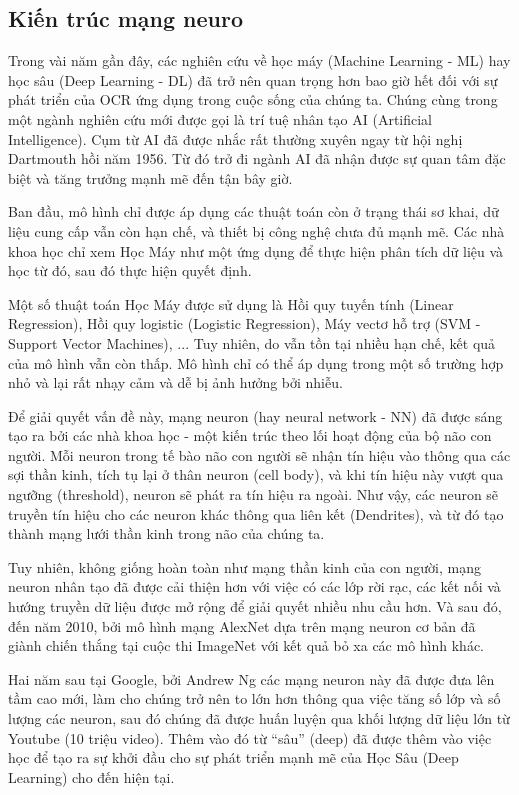 \documentclass[12pt]{report}
\begin{document}
\subsection{Kiến trúc mạng neuro}

Trong vài năm gần đây, các nghiên cứu về học máy (Machine Learning - ML) hay học sâu (Deep Learning - DL) đã trở nên quan trọng hơn bao giờ hết đối với sự phát triển của OCR ứng dụng trong cuộc sống của chúng ta. Chúng cùng trong một ngành nghiên cứu mới được gọi là trí tuệ nhân tạo AI (Artificial Intelligence). Cụm từ AI đã được nhắc rất thường xuyên ngay từ hội nghị Dartmouth hồi năm 1956. Từ đó trở đi ngành AI đã nhận được sự quan tâm đặc biệt và tăng trưởng mạnh mẽ đến tận bây giờ.

Ban đầu, mô hình chỉ được áp dụng các thuật toán còn ở trạng thái sơ khai, dữ liệu cung cấp vẫn còn hạn chế, và thiết bị công nghệ chưa đủ mạnh mẽ. Các nhà khoa học chỉ xem Học Máy như một ứng dụng để thực hiện phân tích dữ liệu và học từ đó, sau đó thực hiện quyết định.

Một số thuật toán Học Máy được sử dụng là Hồi quy tuyến tính (Linear Regression), Hồi quy logistic (Logistic Regression), Máy vectơ hỗ trợ (SVM - Support Vector Machines), ... Tuy nhiên, do vẫn tồn tại nhiều hạn chế, kết quả của mô hình vẫn còn thấp. Mô hình chỉ có thể áp dụng trong một số trường hợp nhỏ và lại rất nhạy cảm và dễ bị ảnh hưởng bởi nhiễu.

Để giải quyết vấn đề này, mạng neuron (hay neural network - NN) đã được sáng tạo ra bởi các nhà khoa học - một kiến trúc theo lối hoạt động của bộ não con người. Mỗi neuron trong tế bào não con người sẽ nhận tín hiệu vào thông qua các sợi thần kinh, tích tụ lại ở thân neuron (cell body), và khi tín hiệu này vượt qua ngưỡng (threshold), neuron sẽ phát ra tín hiệu ra ngoài. Như vậy, các neuron sẽ truyền tín hiệu cho các neuron khác thông qua liên kết (Dendrites), và từ đó tạo thành mạng lưới thần kinh trong não của chúng ta.

Tuy nhiên, không giống hoàn toàn như mạng thần kinh của con người, mạng neuron nhân tạo đã được cải thiện hơn với việc có các lớp rời rạc, các kết nối và hướng truyền dữ liệu được mở rộng để giải quyết nhiều nhu cầu hơn. Và sau đó, đến năm 2010, bởi mô hình mạng AlexNet dựa trên mạng neuron cơ bản đã giành chiến thắng tại cuộc thi ImageNet với kết quả bỏ xa các mô hình khác.

Hai năm sau tại Google, bởi Andrew Ng các mạng neuron này đã được đưa lên tầm cao mới, làm cho chúng trở nên to lớn hơn thông qua việc tăng số lớp và số lượng các neuron, sau đó chúng đã được huấn luyện qua khối lượng dữ liệu lớn từ Youtube (10 triệu video). Thêm vào đó từ “sâu” (deep) đã được thêm vào việc học để tạo ra sự khởi đầu cho sự phát triển mạnh mẽ của Học Sâu (Deep Learning) cho đến hiện tại.
\end{document}

